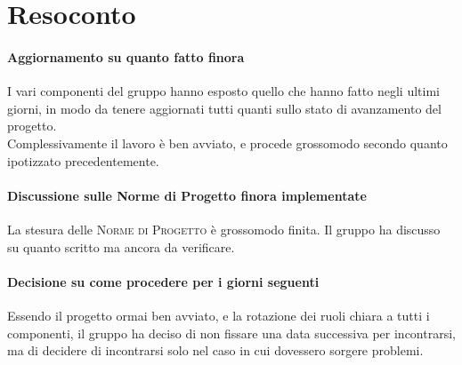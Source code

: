 \documentclass{article}
\begin{document}
\section{Resoconto}%
\label{resoconto}
\paragraph*{Aggiornamento su quanto fatto finora}
I vari componenti del gruppo hanno esposto quello che hanno fatto negli ultimi giorni, in modo da tenere aggiornati tutti quanti sullo stato di avanzamento del progetto. \\
Complessivamente il lavoro è ben avviato, e procede grossomodo secondo quanto ipotizzato precedentemente.

\paragraph*{Discussione sulle Norme di Progetto finora implementate}
La stesura delle \textsc{Norme di Progetto} è grossomodo finita. Il gruppo ha discusso su quanto scritto ma ancora da verificare.

\paragraph*{Decisione su come procedere per i giorni seguenti}
Essendo il progetto ormai ben avviato, e la rotazione dei ruoli chiara a tutti i componenti, il gruppo ha deciso di non fissare una data successiva per incontrarsi, ma di decidere di incontrarsi solo nel caso in cui dovessero sorgere problemi.
\end{document}
